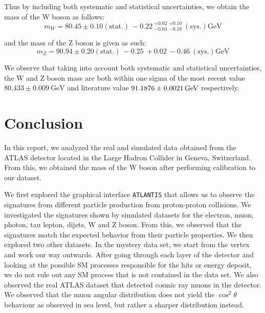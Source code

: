 \documentclass[a4paper]{report}
\numberwithin{equation}{section}
\begin{document}
Thus by including both systematic and statistical uncertainties, we obtain the mass of the W boson as follows:
\begin{equation}
    m_W = 80.45 \pm 0.10 (\mathrm{stat.}) \: -0.22 \: ^{+0.02}_{-0.03} \: ^{+0.10}_{-0.18} \: (\mathrm{sys.}) \si{\giga\electronvolt}
\end{equation}

and the mass of the Z boson is given as such: 
\begin{equation}
    m_Z = 90.94 \pm 0.20 (\mathrm{stat.}) \: -0.25 \: + 0.02 \: -0.46 \: (\mathrm{sys.}) \si{\giga\electronvolt}
\end{equation}

We observe that taking into account both systematic and statistical uncertainties, the W and Z boson mass are both 
within one sigma of the most recent value $80.433 \pm 0.009 \ \text{GeV}$ and literature value 
$\SI{91.1876 \pm 0.0021}{\giga\electronvolt}$ respectively. 

\chapter{Conclusion}

In this report, we analyzed the real and simulated data obtained from the ATLAS detector located in the Large Hadron 
Collider in Geneva, Switzerland. From this, we obtained the mass of the W boson after performing calibration 
to our dataset. \par 

We first explored the graphical interface \texttt{ATLANTIS} that allows us to observe the signatures from different particle 
production from proton-proton collisions. We investigated the signatures shown by simulated datasets for the 
electron, muon, photon, tau lepton, dijets, W and Z boson. From this, we observed that the signatures match the expected 
behavior from their particle properties. We then explored two other datasets. In the mystery data set, we start from the vertex and work our way outwards. After going through each layer of the detector and looking at the possible SM processes responsible for the hits or energy deposit, we do not rule out any SM process that is not contained in the data set. 
We also observed the real ATLAS dataset that detected cosmic ray muons in the detector. We observed that the muon angular
distribution does not yield the $\cos^2 \theta$ behaviour as observed in sea level, but rather a sharper distribution instead. \par
\end{document}
